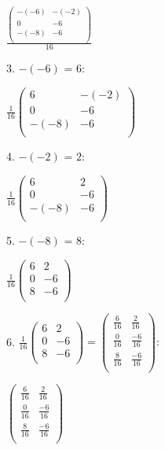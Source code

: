 \documentclass{article}
\begin{document}
$\frac{\left(
\begin{array}{cc}
-(-6) & -(-2) \\
 0 & -6 \\
 -(-8) & -6 \\
\end{array}
\right)}{16}$

3. $-(-6)\text{ = }6:$

$\frac{1}{16}\left(
\begin{array}{cc}
6 & -(-2) \\
 0 & -6 \\
 -(-8) & -6 \\
\end{array}
\right)$

4. $-(-2)\text{ = }2:$

$\frac{1}{16}\left(
\begin{array}{cc}
6 & 2 \\
 0 & -6 \\
 -(-8) & -6 \\
\end{array}
\right)$

5. $-(-8)\text{ = }8:$

$\frac{1}{16}\left(
\begin{array}{cc}
6 & 2 \\
 0 & -6 \\
 8 & -6 \\
\end{array}
\right)$

6. $\frac{1}{16}\left(
\begin{array}{cc}
6 & 2 \\
 0 & -6 \\
 8 & -6 \\
\end{array}
\right)=\left(
\begin{array}{cc}
\frac{6}{16} & \frac{2}{16} \\
 \frac{0}{16} & \frac{-6}{16} \\
 \frac{8}{16} & \frac{-6}{16} \\
\end{array}
\right):$

$\left(
\begin{array}{cc}
\frac{6}{16} & \frac{2}{16} \\
 \frac{0}{16} & \frac{-6}{16} \\
 \frac{8}{16} & \frac{-6}{16} \\
\end{array}
\right)$
\end{document}
